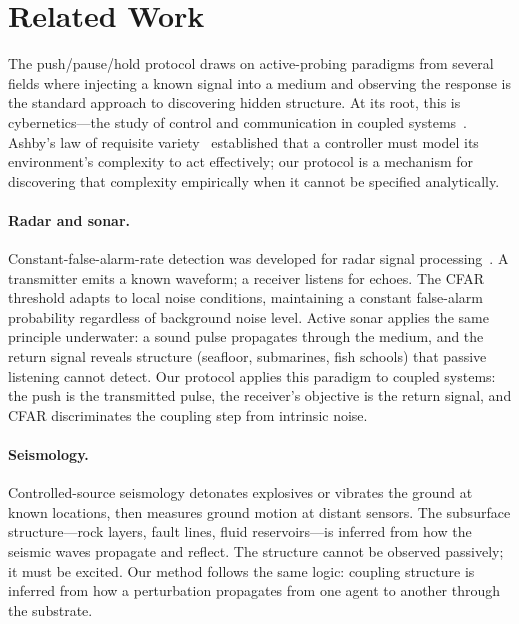 \section{Related Work}
\label{sec:related}

The push/pause/hold protocol draws on active-probing paradigms from
several fields where injecting a known signal into a medium and
observing the response is the standard approach to discovering
hidden structure. At its root, this is cybernetics---the study of
control and communication in coupled
systems~\citep{wiener1948cybernetics}. Ashby's law of requisite
variety~\citep{ashby1956introduction} established that a controller
must model its environment's complexity to act effectively; our
protocol is a mechanism for discovering that complexity empirically
when it cannot be specified analytically.

\paragraph{Radar and sonar.}
Constant-false-alarm-rate detection was developed for radar signal
processing~\citep{finn1968cfar}. A transmitter emits a known waveform;
a receiver listens for echoes. The CFAR threshold adapts to local
noise conditions, maintaining a constant false-alarm probability
regardless of background noise level. Active sonar applies the same
principle underwater: a sound pulse propagates through the medium, and
the return signal reveals structure (seafloor, submarines, fish
schools) that passive listening cannot detect. Our protocol applies
this paradigm to coupled systems: the push is the transmitted pulse,
the receiver's objective is the return signal, and CFAR discriminates
the coupling step from intrinsic noise.

\paragraph{Seismology.}
Controlled-source seismology detonates explosives or vibrates the
ground at known locations, then measures ground motion at distant
sensors. The subsurface structure---rock layers, fault lines, fluid
reservoirs---is inferred from how the seismic waves propagate and
reflect. The structure cannot be observed passively; it must be
excited. Our method follows the same logic: coupling structure is
inferred from how a perturbation propagates from one agent to
another through the substrate.

